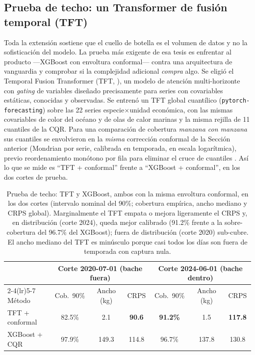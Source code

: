 \documentclass[twoside,11pt]{article}
\begin{document}
\subsection{Prueba de techo: un Transformer de fusión temporal (TFT)}
\label{sec:extension_tft}
Toda la extensión sostiene que el cuello de botella es el volumen de datos y no la sofisticación del modelo. La prueba más exigente de esa tesis es enfrentar al producto ---XGBoost con envoltura conformal--- contra una arquitectura de vanguardia y comprobar si la complejidad adicional \emph{compra} algo. Se eligió el Temporal Fusion Transformer (TFT, \citealp{lim2021}), un modelo de atención multi-horizonte con \emph{gating} de variables diseñado precisamente para series con covariables estáticas, conocidas y observadas. Se entrenó un TFT global cuantílico (\texttt{pytorch-forecasting}) sobre las 22 series especie$\times$unidad económica, con las mismas covariables de color del océano y de olas de calor marinas y la misma rejilla de 11 cuantiles de la CQR. Para una comparación de cobertura \emph{manzana con manzana} sus cuantiles se envolvieron en la \emph{misma} corrección conformal de la Sección anterior (Mondrian por serie, calibrada en temporada, en escala logarítmica), previo reordenamiento monótono por fila para eliminar el cruce de cuantiles \citep{chernozhukov2010}. Así lo que se mide es ``TFT + conformal'' frente a ``XGBoost + conformal'', en los dos cortes de prueba.

\begin{table}[htbp]
\centering
\small
\begin{tabular}{lcccccc}
\toprule
 & \multicolumn{3}{c}{Corte 2020-07-01 (bache fuera)} & \multicolumn{3}{c}{Corte 2024-06-01 (bache dentro)} \\
\cmidrule(lr){2-4}\cmidrule(lr){5-7}
Método & Cob.\ 90\% & Ancho (kg) & CRPS & Cob.\ 90\% & Ancho (kg) & CRPS \\
\midrule
TFT + conformal & 82.5\% & 2.1 & \textbf{90.6} & \textbf{91.2\%} & 1.5 & \textbf{117.8} \\
XGBoost + CQR & 97.9\% & 149.3 & 114.8 & 96.7\% & 137.8 & 130.8 \\
\bottomrule
\end{tabular}
\caption{Prueba de techo: TFT y XGBoost, ambos con la misma envoltura conformal, en los dos cortes (intervalo nominal del 90\%; cobertura empírica, ancho mediano y CRPS global). Marginalmente el TFT empata o mejora ligeramente el CRPS y, en distribución (corte 2024), queda mejor calibrado (91.2\% frente a la sobre-cobertura del 96.7\% del XGBoost); fuera de distribución (corte 2020) sub-cubre. El ancho mediano del TFT es minúsculo porque casi todos los días son fuera de temporada con captura nula.}
\label{tab:extension_tft}
\end{table}
\end{document}
